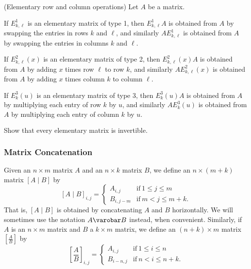 \begin{exercises}
\ResumeExercises
\item{\label{exr:ercos}}
(Elementary row and column operations) Let $A$ be a matrix.
\begin{enumerate*}
\item If $E^1_{k,\ell}$ is an elementary matrix of type 1, then $E^1_{k,\ell}A$ is obtained from $A$ by swapping the entries in rows $k$ and $\ell$, and similarly $AE^1_{k,\ell}$ is obtained from $A$ by swapping the entries in columns $k$ and $\ell$.
\item If $E^2_{k,\ell}(x)$ is an elementary matrix of type 2, then $E^2_{k,\ell}(x)A$ is obtained from $A$ by adding $x$ times row $\ell$ to row $k$, and similarly $AE^2_{k,\ell}(x)$ is obtained from $A$ by adding $x$ times column $k$ to column $\ell$.
\item If $E^3_k(u)$ is an elementary matrix of type 3, then $E^3_k(u)A$ is obtained from $A$ by multiplying each entry of row $k$ by $u$, and similarly $AE^3_k(u)$ is obtained from $A$ by multiplying each entry of column $k$ by $u$.
\end{enumerate*}

\item{\label{exr:elementary-matrix-is-invertible}}
Show that every elementary matrix is invertible.
\PauseExercises
\end{exercises}

\subsubsection*{Matrix Concatenation}

Given an $n \times m$ matrix $A$ and an $n \times k$ matrix $B$, we define an $n \times (m+k)$ matrix $[A \mid B]$ by \[[A \mid B]_{i,j} = \left\{ \begin{array}{ll} A_{i,j} & \mathrm{if}\ 1 \leq j \leq m \\ B_{i,j-m} & \mathrm{if}\ m < j \leq m+k. \end{array}\right.\] That is, $[A \mid B]$ is obtained by concatenating $A$ and $B$ horizontally. We will sometimes use the notation $A \varobar B$ instead, when convenient. Similarly, if $A$ is an $n \times m$ matrix and $B$ a $k \times m$ matrix, we define an $(n+k) \times m$ matrix $\left[ \frac{A}{B} \right]$ by \[ \left[ \frac{A}{B} \right]_{i,j} = \left\{ \begin{array}{ll} A_{i,j} & \mathrm{if}\ 1 \leq i \leq n \\ B_{i-n,j} & \mathrm{if}\ n < i \leq n+k. \end{array} \right. \]

